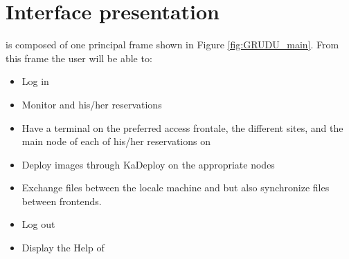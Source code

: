 
\chapter{Interface presentation}

\grudu is composed of one principal frame shown in Figure \ref{fig:GRUDU_main}.
From this frame the user will be able to:
\begin{itemize}
  \item Log in \gfk
  \item Monitor \gfk and his/her reservations
  \item Have a terminal on the preferred access frontale, the different sites,
  and the main node of each of his/her reservations on \gfk
  \item Deploy images through KaDeploy on the appropriate nodes
  \item Exchange files between the locale machine and \gfk but also synchronize
  files between \gfk frontends.
  \item Log out
  \item Display the Help of \grudu
\end{itemize}

